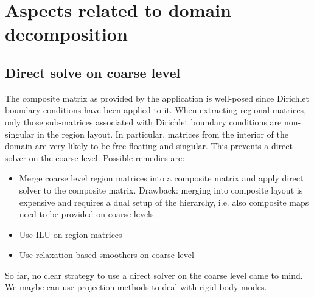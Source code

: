 \documentclass[11pt]{article}
\begin{document}
\section{Aspects related to domain decomposition}

\subsection{Direct solve on coarse level}

The composite matrix as provided by the application is well-posed since Dirichlet boundary conditions have been applied to it. 
When extracting regional matrices, only those sub-matrices associated with Dirichlet boundary conditions are non-singular
in the region layout. In particular, matrices from the interior of the domain are very likely to be free-floating and singular. 
This prevents a direct solver on the coarse level. Possible remedies are:
\begin{itemize}
\item Merge coarse level region matrices into a composite matrix and apply direct solver to the composite matrix. 
Drawback: merging into composite layout is expensive and requires a dual setup of the hierarchy, 
i.e. also composite maps need to be provided on coarse levels.
\item Use ILU on region matrices
\item Use relaxation-based smoothers on coarse level
\end{itemize}
So far, no clear strategy to use a direct solver on the coarse level came to mind. 
We maybe can use projection methods to deal with rigid body modes.
\end{document}
